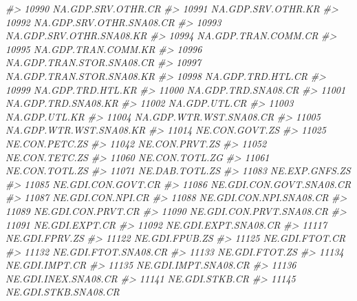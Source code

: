 \documentclass[
]{bxjsbook}
\newenvironment{Shaded}{\begin{snugshade}}{\end{snugshade}}
\newcommand{\CommentTok}[1]{\textcolor[rgb]{0.56,0.35,0.01}{\textit{#1}}}
\theoremstyle{definition}
\theoremstyle{definition}
\theoremstyle{definition}
\theoremstyle{definition}
\theoremstyle{remark}
\begin{document}
\begin{Shaded}
\begin{Highlighting}[]
\CommentTok{\#\textgreater{} 10990         NA.GDP.SRV.OTHR.CR}
\CommentTok{\#\textgreater{} 10991         NA.GDP.SRV.OTHR.KR}
\CommentTok{\#\textgreater{} 10992   NA.GDP.SRV.OTHR.SNA08.CR}
\CommentTok{\#\textgreater{} 10993   NA.GDP.SRV.OTHR.SNA08.KR}
\CommentTok{\#\textgreater{} 10994        NA.GDP.TRAN.COMM.CR}
\CommentTok{\#\textgreater{} 10995        NA.GDP.TRAN.COMM.KR}
\CommentTok{\#\textgreater{} 10996  NA.GDP.TRAN.STOR.SNA08.CR}
\CommentTok{\#\textgreater{} 10997  NA.GDP.TRAN.STOR.SNA08.KR}
\CommentTok{\#\textgreater{} 10998          NA.GDP.TRD.HTL.CR}
\CommentTok{\#\textgreater{} 10999          NA.GDP.TRD.HTL.KR}
\CommentTok{\#\textgreater{} 11000        NA.GDP.TRD.SNA08.CR}
\CommentTok{\#\textgreater{} 11001        NA.GDP.TRD.SNA08.KR}
\CommentTok{\#\textgreater{} 11002              NA.GDP.UTL.CR}
\CommentTok{\#\textgreater{} 11003              NA.GDP.UTL.KR}
\CommentTok{\#\textgreater{} 11004    NA.GDP.WTR.WST.SNA08.CR}
\CommentTok{\#\textgreater{} 11005    NA.GDP.WTR.WST.SNA08.KR}
\CommentTok{\#\textgreater{} 11014             NE.CON.GOVT.ZS}
\CommentTok{\#\textgreater{} 11025             NE.CON.PETC.ZS}
\CommentTok{\#\textgreater{} 11042             NE.CON.PRVT.ZS}
\CommentTok{\#\textgreater{} 11052             NE.CON.TETC.ZS}
\CommentTok{\#\textgreater{} 11060             NE.CON.TOTL.ZG}
\CommentTok{\#\textgreater{} 11061             NE.CON.TOTL.ZS}
\CommentTok{\#\textgreater{} 11071             NE.DAB.TOTL.ZS}
\CommentTok{\#\textgreater{} 11083             NE.EXP.GNFS.ZS}
\CommentTok{\#\textgreater{} 11085         NE.GDI.CON.GOVT.CR}
\CommentTok{\#\textgreater{} 11086   NE.GDI.CON.GOVT.SNA08.CR}
\CommentTok{\#\textgreater{} 11087          NE.GDI.CON.NPI.CR}
\CommentTok{\#\textgreater{} 11088    NE.GDI.CON.NPI.SNA08.CR}
\CommentTok{\#\textgreater{} 11089         NE.GDI.CON.PRVT.CR}
\CommentTok{\#\textgreater{} 11090   NE.GDI.CON.PRVT.SNA08.CR}
\CommentTok{\#\textgreater{} 11091             NE.GDI.EXPT.CR}
\CommentTok{\#\textgreater{} 11092       NE.GDI.EXPT.SNA08.CR}
\CommentTok{\#\textgreater{} 11117             NE.GDI.FPRV.ZS}
\CommentTok{\#\textgreater{} 11122             NE.GDI.FPUB.ZS}
\CommentTok{\#\textgreater{} 11125             NE.GDI.FTOT.CR}
\CommentTok{\#\textgreater{} 11132       NE.GDI.FTOT.SNA08.CR}
\CommentTok{\#\textgreater{} 11133             NE.GDI.FTOT.ZS}
\CommentTok{\#\textgreater{} 11134             NE.GDI.IMPT.CR}
\CommentTok{\#\textgreater{} 11135       NE.GDI.IMPT.SNA08.CR}
\CommentTok{\#\textgreater{} 11136       NE.GDI.INEX.SNA08.CR}
\CommentTok{\#\textgreater{} 11141             NE.GDI.STKB.CR}
\CommentTok{\#\textgreater{} 11145       NE.GDI.STKB.SNA08.CR}

\end{Highlighting}
\end{Shaded}
\end{document}
